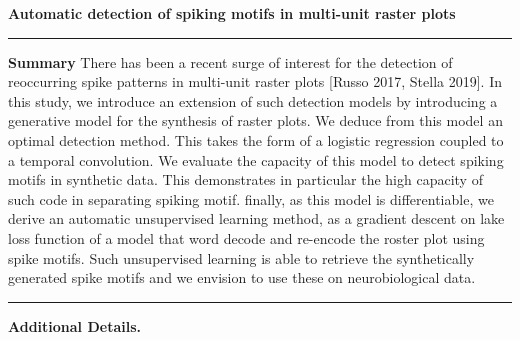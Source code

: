 \documentclass[11pt]{article}
\begin{document}
{\Large\bf 
Automatic detection of spiking motifs in multi-unit raster plots
}

\hrule
\textbf{Summary} %
There has been a recent surge of interest for the detection of reoccurring spike patterns in multi-unit raster plots [Russo 2017, Stella 2019]. In this study, we introduce an extension of such detection models by introducing a generative model for the synthesis of raster plots. We deduce from this model an optimal detection method. This takes the form of a logistic regression coupled to a temporal convolution. We evaluate the capacity of this model to detect spiking motifs in synthetic data. This demonstrates in particular the high capacity of such code in separating spiking motif. finally, as this model is differentiable, we derive an automatic unsupervised learning method, as a gradient descent on lake loss function of a model that word decode and re-encode the roster plot using spike motifs. Such unsupervised learning is able to retrieve the synthetically generated spike motifs and we envision to use these on neurobiological data.
\vspace{.5cm}
\hrule
\textbf{Additional Details.}%
\end{document}
